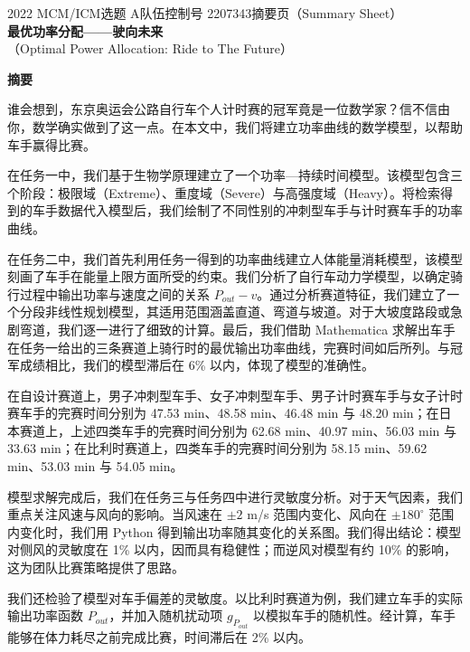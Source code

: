 \documentclass[11pt,a4paper]{ctexart}
\begin{document}
\thispagestyle{empty}
\begin{center}
{\small 2022 MCM/ICM\quad 选题 A\quad 队伍控制号 2207343\quad 摘要页（Summary Sheet）}\\[18pt]
{\LARGE\bfseries 最优功率分配——驶向未来}\\[8pt]
{\large （Optimal Power Allocation: Ride to The Future）}\\[10pt]
\end{center}

\begin{center}
{\large\bfseries 摘\quad 要}
\end{center}

\vspace{6pt}
谁会想到，东京奥运会公路自行车个人计时赛的冠军竟是一位数学家？信不信由你，数学确实做到了这一点。在本文中，我们将建立功率曲线的数学模型，以帮助车手赢得比赛。

在任务一中，我们基于生物学原理建立了一个功率—持续时间模型。该模型包含三个阶段：极限域（Extreme）、重度域（Severe）与高强度域（Heavy）。将检索得到的车手数据代入模型后，我们绘制了不同性别的冲刺型车手与计时赛车手的功率曲线。

在任务二中，我们首先利用任务一得到的功率曲线建立人体能量消耗模型，该模型刻画了车手在能量上限方面所受的约束。我们分析了自行车动力学模型，以确定骑行过程中输出功率与速度之间的关系 $P_{out}-v$。通过分析赛道特征，我们建立了一个分段非线性规划模型，其适用范围涵盖直道、弯道与坡道。对于大坡度路段或急剧弯道，我们逐一进行了细致的计算。最后，我们借助 Mathematica 求解出车手在任务一给出的三条赛道上骑行时的最优输出功率曲线，完赛时间如后所列。与冠军成绩相比，我们的模型滞后在 6\% 以内，体现了模型的准确性。

在自设计赛道上，男子冲刺型车手、女子冲刺型车手、男子计时赛车手与女子计时赛车手的完赛时间分别为 47.53 min、48.58 min、46.48 min 与 48.20 min；在日本赛道上，上述四类车手的完赛时间分别为 62.68 min、40.97 min、56.03 min 与 33.63 min；在比利时赛道上，四类车手的完赛时间分别为 58.15 min、59.62 min、53.03 min 与 54.05 min。

模型求解完成后，我们在任务三与任务四中进行灵敏度分析。对于天气因素，我们重点关注风速与风向的影响。当风速在 $\pm 2$ m/s 范围内变化、风向在 $\pm 180^{\circ}$ 范围内变化时，我们用 Python 得到输出功率随其变化的关系图。我们得出结论：模型对侧风的灵敏度在 1\% 以内，因而具有稳健性；而逆风对模型有约 10\% 的影响，这为团队比赛策略提供了思路。

我们还检验了模型对车手偏差的灵敏度。以比利时赛道为例，我们建立车手的实际输出功率函数 $P_{out}$，并加入随机扰动项 $g_{P_{out}}$ 以模拟车手的随机性。经计算，车手能够在体力耗尽之前完成比赛，时间滞后在 2\% 以内。
\end{document}

